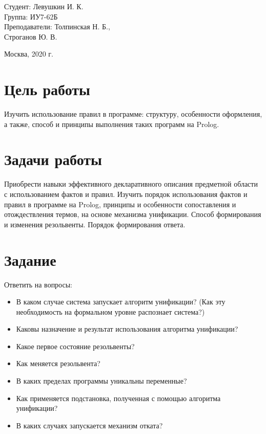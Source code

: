 \documentclass[a4paper,12pt]{article}
\begin{document}
	\vspace*{15mm} 	
	
	\large
	\begin{flushright}
		Студент: Левушкин И. К. \\
		Группа: ИУ7-62Б \\
		Преподаватели: Толпинская Н. Б., \\ Строганов Ю. В. \\
	\end{flushright}
	
	\vspace*{30mm}
	\begin{center}
		Москва, 2020 г.  
	\end{center}
	\thispagestyle{empty}
	
	
	\newpage
	
	\section*{Цель работы}
	
	Изучить использование правил в программе: структуру, особенности оформления, а также, способ и принципы выполнения таких программ на Prolog.
	
	\section*{Задачи работы}
	
	Приобрести навыки эффективного декларативного описания предметной области с использованием фактов и правил.
	Изучить порядок использования фактов и правил в программе на Prolog, принципы и особенности сопоставления и отождествления термов, на основе механизма унификации. Способ формирования и изменения резольвенты. Порядок формирования ответа.
	
	\section*{Задание}
	
	Ответить на вопросы:
	\begin{itemize}
		\item В каком случае система запускает алгоритм унификации? (Как эту необходимость на формальном уровне распознает система?)
		\item Каковы назначение и результат использования алгоритма унификации? 
		\item Какое первое состояние резольвенты?
		\item Как меняется резольвента?
		\item В каких пределах программы уникальны переменные? 
		\item Как применяется подстановка, полученная с помощью алгоритма унификации?
		\item В каких случаях запускается механизм отката?
	\end{itemize}
	
\end{document}
